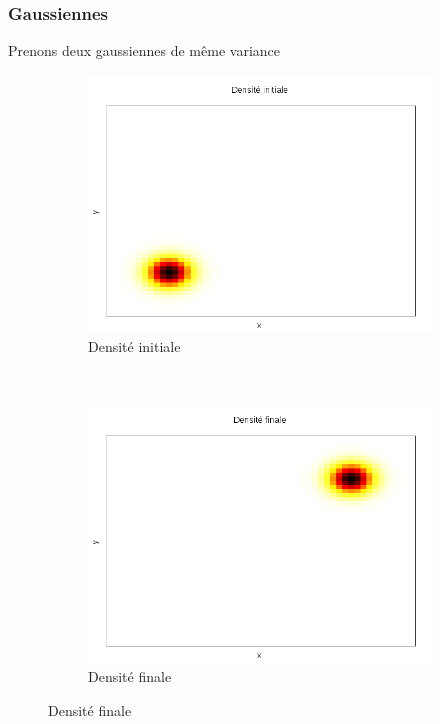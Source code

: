\documentclass[a4paper,12pt]{article}
\begin{document}
\subsubsection{Gaussiennes}
Prenons deux gaussiennes de même variance 
\begin{figure}[!h]
\centering 
\hspace{-0.5cm}
	\begin{subfigure}[b]{0.3\linewidth}
	\includegraphics[width=\textwidth]{img/2DGaussian/f0.png}
	\caption{Densité initiale}
	\end{subfigure}
	~
	\begin{subfigure}[b]{0.3\linewidth}
	\includegraphics[width=\textwidth]{img/2DGaussian/f1.png}
	\caption{Densité finale}

\end{subfigure}
\end{figure}
\end{document}
